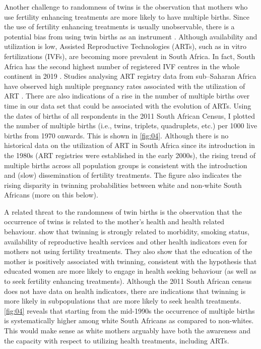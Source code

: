 Another challenge to randomness of twins is the observation that mothers who use fertility enhancing treatments are more likely to have multiple births. Since the use of fertility enhancing treatments is usually unobservable, there is a potential bias from using twin births as an instrument \parencite{braakmann_reconsidering_2016}. Although availability and utilization is low, Assisted Reproductive Technologies (ARTs), such as in vitro fertilizations (IVFs), are becoming more prevalent in South Africa. In fact, South Africa has the second highest number of registered IVF centres in the whole continent in 2019 \parencite{Ombelet2019}. Studies analysing ART registry data from sub–Saharan Africa have observed high multiple pregnancy rates associated with the utilization of ART \parencite{Botha2018,Dyer2019}. There are also indications of a rise in the number of multiple births over time in our data set that could be associated with the evolution of ARTs. Using the dates of births of all respondents in the 2011 South African Census, I plotted the number of multiple births (i.e., twins, triplets, quadruplets, etc.) per 1000 live births from 1970 onwards. This is shown in \autoref{fig:04}. Although there is no historical data on the utilization of ART in South Africa since its introduction in the 1980s (ART registries were established in the early 2000s), the rising trend of multiple births across all population groups is consistent with the introduction and (slow) dissemination of fertility treatments. The figure also indicates the rising disparity in twinning probabilities between white and non-white South Africans (more on this below).

A related threat to the randomness of twin births is the observation that the occurrence of twins is related to the mother's health and health related behaviour. \textcite{bhalotra_twin_2019} show that twinning is strongly related to morbidity, smoking status, availability of reproductive health services and other health indicators even for mothers not using fertility treatments. They also show that the education of the mother is positively associated with twinning, consistent with the hypothesis that educated women are more likely to engage in health seeking behaviour (as well as to seek fertility enhancing treatments). Although the 2011 South African census does not have data on health indicators, there are indications that twinning is more likely in subpopulations that are more likely to seek health treatments. \autoref{fig:04} reveals that starting from the mid-1990s the occurrence of multiple births is systematically higher among white South Africans as compared to non-whites. This would make sense as white mothers arguably have both the awareness and the capacity with respect to utilizing health treatments, including ARTs. 

